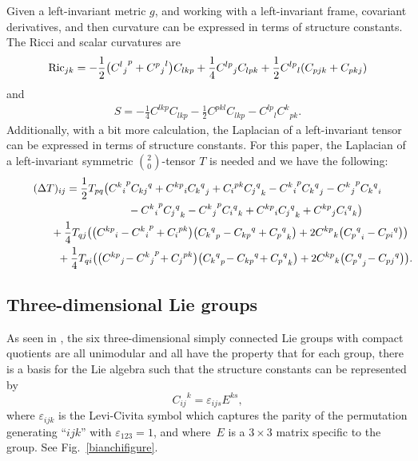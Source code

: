 \documentclass[pdftex]{sigma}
\numberwithin{equation}{section}
\begin{document}
Given a left-invariant metric $g$, and working with a left-invariant frame, covariant derivatives, and then curvature can be expressed in terms of structure constants. The Ricci and scalar curvatures are
\begin{gather}\label{Riccistructureeqn}
{\rm Ric}_{jk} = -\frac{1}{2} \big({{C^l}_j}^p + {{C^p}_j}^l\big) C_{lkp}
			+ \frac{1}{4} {C^{lp}}_j C_{lpk}
			+ \frac{1}{2} {C^{lp}}_l(C_{pjk} + C_{pkj})
\end{gather}
and
\begin{gather} \label{Scalarstructureeqn}
S = -\frac{1}{4} C^{lkp} C_{lkp} - \frac{1}{2} C^{pkl} C_{lkp} - {C^{lp}}_l {C^k}_{pk}.
\end{gather}
Additionally, with a bit more calculation, the Laplacian of a left-invariant tensor can be expressed in terms of structure constants. For this paper, the Laplacian of a left-invariant symmetric $\binom{2}{0}$-tensor $T$ is needed and we have the following:
\begin{gather}
(\Delta T)_{ij} = \frac{1}{2} T_{pq}
				\big({{C^k}_i}^p {C_{kj}}^q + {C^{kp}}_i {{C_k}^q}_j + {C_i}^{pk} {{C_j}^q}_k
				-
					{{C^k}_i}^p {{C_k}^q}_j - {{C^k}_j}^p {{C_k}^q}_i \nonumber\\
\hphantom{(\Delta T)_{ij} = \frac{1}{2} T_{pq}\big(}{} -
					{{C^k}_i}^p {{C_j}^q}_k - {{C^k}_j}^p {{C_i}^q}_k
				 +
					{C^{kp}}_i {{C_j}^q}_k + {C^{kp}}_j {{C_i}^q}_k \big)\nonumber \\
\hphantom{(\Delta T)_{ij} =}{}+ \frac{1}{4} T_{qj}
				\big(\big({C^{kp}}_i - {{C^k}_i}^p + {C_i}^{pk}\big)
						\big({{C_k}^q}_p - {C_{kp}}^q + {{C_p}^q}_k\big)
 +2
					{C^{kp}}_k\big({{C_p}^q}_i - {C_{pi}}^q\big) \big) \nonumber\\
\hphantom{(\Delta T)_{ij} =}{}+ \frac{1}{4} T_{qi}
				\big(\big({C^{kp}}_j\! - {{C^k}_j}^p \!+ {C_j}^{pk}\big)
						\big({{C_k}^q}_p\! - {C_{kp}}^q\! + {{C_p}^q}_k\big)
 +2
					{C^{kp}}_k\big({{C_p}^q}_j \! - {C_{pj}}^q\big) \big).\!\!\!\!\!\!\label{Laplacianstructureeqn}
\end{gather}


\subsection{Three-dimensional Lie groups}

As seen in \cite{RyanShepley}, the six three-dimensional simply connected Lie groups with compact quotients are all unimodular and all have the property that for each group, there is a basis for the Lie algebra such that the structure constants can be represented by
\[
{C_{ij}}^k = \varepsilon_{ijs} E^{ks},
\]
where $\varepsilon_{ijk}$ is the Levi-Civita symbol which captures the parity of the permutation generating ``$ijk$'' with $\varepsilon_{123} = 1$, and where~$E$ is a $3 \times 3$ matrix specific to the group. See Fig.~\ref{bianchifigure}.
\end{document}
